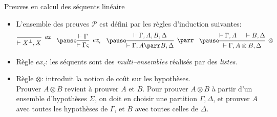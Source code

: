 \documentclass{beamer}
\newcommand*{\orth}{^\perp}
\newcommand*{\tensor}{\otimes}
\newcommand*{\hypv}[1]{\hypo{\vdash #1}}
\newcommand*{\axv}[1]{\infer{0}[\ensuremath{\mathit{ax}}]{\vdash #1}}
\newcommand*{\tensorv}[1]{\infer{2}[\ensuremath{\tensor}]{\vdash #1}}
\newcommand*{\parrv}[1]{\infer{1}[\ensuremath{\parr}]{\vdash #1}}
\newcommand*{\permv}[2]{\infer{1}[\ensuremath{\textit{ex}_{#1}}]{\vdash #2}}
\newcommand*{\permapp}[2]{#2 #1}
\newcommand*{\someperm}{\varsigma}
\newcommand*{\sequent}{\Gamma}
\newcommand*{\sequentbis}{\Delta}
\newcommand*{\proofs}{\ensuremath{\mathcal{P}}}
\begin{document}
\begin{frame}{Preuves en calcul des séquents linéaire}
    \begin{itemize}
        \item L'ensemble des preuves \proofs{} est défini par les règles d'induction suivantes:\pause
            \begin{equation*}
            \begin{prooftree}
              \axv{X\orth, X}
            \end{prooftree}
            \; \; \; \pause
            \begin{prooftree}
              \hypv{\sequent}
              \permv{\someperm}{\permapp{\someperm}{\sequent}}
            \end{prooftree}
            \; \; \; \pause
            \begin{prooftree}
              \hypv{\sequent, A, B, \sequentbis}
              \parrv{\sequent, A \parr B, \sequentbis}
            \end{prooftree}
            \; \; \; \pause
            \begin{prooftree}
              \hypv{\sequent, A}
              \hypv{B, \sequentbis}
              \tensorv{\sequent, A \tensor B, \sequentbis}
            \end{prooftree}
            \end{equation*}
            \pause
        \item Règle $\textit{ex}_{\someperm}$: \pause les séquents sont des \textit{multi--ensembles} réalisés par des \textit{listes}.
            \pause
        \item Règle $\tensor$: \pause introduit la notion de coût sur les hypothèses.\\
        \pause Prouver $A \tensor B$ revient à prouver $A$ et $B$. Pour prouver $A \tensor B$ à partir d'un ensemble d'hypothèses $\Sigma$, on doit en choisir une partition $\sequent, \sequentbis$, et prouver $A$ avec toutes les hypothèses de $\sequent$, et $B$ avec toutes celles de $\sequentbis$.
    \end{itemize}
\end{frame}
\end{document}
